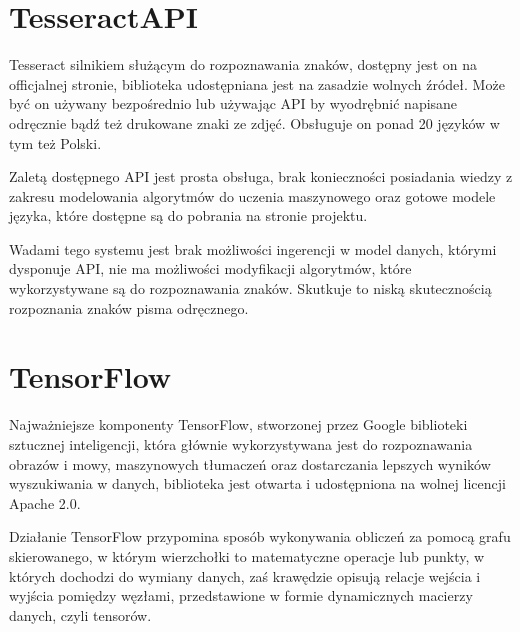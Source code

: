 \documentclass[brudnopis]{xmgr}
\begin{document}
\section{TesseractAPI}

Tesseract silnikiem służącym do rozpoznawania znaków, dostępny jest on na officjalnej stronie\cite{1}, biblioteka udostępniana jest na zasadzie wolnych źródeł. Może być on używany bezpośrednio lub używając API by wyodrębnić napisane odręcznie bądź też drukowane znaki ze zdjęć. Obsługuje on ponad 20 języków w tym też Polski.

Zaletą dostępnego API jest prosta obsługa, brak konieczności posiadania wiedzy z zakresu modelowania algorytmów do uczenia maszynowego oraz gotowe modele języka, które dostępne są do pobrania na stronie projektu.

Wadami tego systemu jest brak możliwości ingerencji w model danych, którymi dysponuje API, nie ma możliwości modyfikacji algorytmów, które wykorzystywane są do rozpoznawania znaków. Skutkuje to niską skutecznością rozpoznania znaków pisma odręcznego.

\section{TensorFlow}

Najważniejsze komponenty TensorFlow, stworzonej przez Google biblioteki sztucznej inteligencji, która głównie wykorzystywana jest do rozpoznawania obrazów i mowy, maszynowych tłumaczeń oraz dostarczania lepszych wyników wyszukiwania w danych, biblioteka jest otwarta i udostępniona na wolnej licencji Apache 2.0.

Działanie TensorFlow przypomina sposób wykonywania obliczeń za pomocą grafu skierowanego, w którym wierzchołki to matematyczne operacje lub punkty, w których dochodzi do wymiany danych, zaś krawędzie opisują relacje wejścia i wyjścia pomiędzy węzłami, przedstawione w formie dynamicznych macierzy danych, czyli tensorów.
\end{document}
